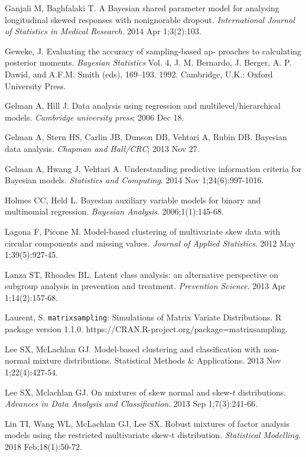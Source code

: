 \documentclass[useAMS,referee]{biom}
\begin{document}
\begin{thebibliography}{}
\bibitem{ } Ganjali M, Baghfalaki T. A Bayesian shared parameter model for analysing longitudinal skewed responses with nonignorable dropout. \textit{International Journal of Statistics in Medical Research}. 2014 Apr 1;3(2):103.

\bibitem{ } Geweke, J. Evaluating the accuracy of sampling-based ap- proaches to calculating posterior moments. \textit{Bayesian Statistics} Vol. 4, J. M. Bernardo, J. Berger, A. P. Dawid, and A.F.M. Smith (eds), 169–193. 1992. Cambridge, U.K.: Oxford University Press.

\bibitem{ } Gelman A, Hill J. Data analysis using regression and multilevel/hierarchical models. \textit{Cambridge university press}; 2006 Dec 18.

\bibitem{ } Gelman A, Stern HS, Carlin JB, Dunson DB, Vehtari A, Rubin DB. Bayesian data analysis. \textit{Chapman and Hall/CRC}; 2013 Nov 27.

\bibitem{ } Gelman A, Hwang J, Vehtari A. Understanding predictive information criteria for Bayesian models. \textit{Statistics and Computing}. 2014 Nov 1;24(6):997-1016.

\bibitem{ } Holmes CC, Held L. Bayesian auxiliary variable models for binary and multinomial regression. \textit{Bayesian Analysis}. 2006;1(1):145-68.

\bibitem{ } Lagona F, Picone M. Model-based clustering of multivariate skew data with circular components and missing values. \textit{Journal of Applied Statistics}. 2012 May 1;39(5):927-45.

\bibitem{ } Lanza ST, Rhoades BL. Latent class analysis: an alternative perspective on subgroup analysis in prevention and treatment. \textit{Prevention Science}. 2013 Apr 1;14(2):157-68.

\bibitem{ } Laurent, S. \texttt{matrixsampling}: Simulations of Matrix Variate Distributions. R package version 1.1.0.
https://CRAN.R-project.org/package=matrixsampling.

\bibitem{ } Lee SX, McLachlan GJ. Model-based clustering and classification with non-normal mixture distributions. Statistical Methods \& Applications. 2013 Nov 1;22(4):427-54.

\bibitem{ } Lee SX, Mclachlan GJ. On mixtures of skew normal and skew-$t$ distributions. \textit{Advances in Data Analysis and Classification}. 2013 Sep 1;7(3):241-66.

\bibitem{ } Lin TI, Wang WL, McLachlan GJ, Lee SX. Robust mixtures of factor analysis models using the restricted multivariate skew-t distribution. \textit{Statistical Modelling}. 2018 Feb;18(1):50-72.


\end{thebibliography}
\end{document}

